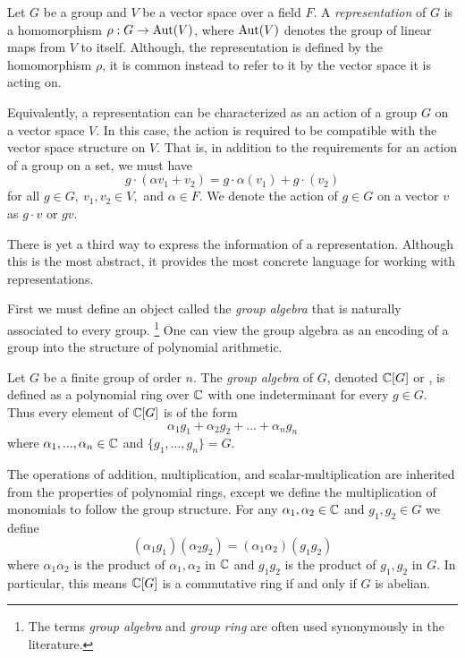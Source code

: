 \begin{definition}
    Let $G$ be a group and $V$ be a vector space over a field $F$. A \emph{representation} of $G$ is a homomorphism 
    $\rho : G \rightarrow \operatorname{Aut}(V)$, where $\operatorname{Aut}(V)$ denotes the group of linear maps from $V$ to itself. Although, 
    the representation is defined by the homomorphism $\rho$, it is common instead to refer to it by the vector 
    space it is acting on.
    
    Equivalently, a representation can be characterized as an action of a group $G$ on a vector space $V$. In this 
    case, the action is required to be compatible with the vector space structure on $V$. That is, in addition to 
    the requirements for an action of a group on a set, we must have
\[g \cdot (\alpha v_1 + v_2) = g\cdot \alpha(v_1) + g\cdot(v_2)\]
    for all $g \in G,\ v_1, v_2 \in V,$ and $\alpha \in F$.
    We denote the action of $g \in G$ on a vector $v$ as $g \cdot v$ or $gv$.
\end{definition}


    There is yet a third way to express the information of a representation. Although this is the most abstract, it 
    provides the most concrete language for working with representations.
    
    First we must define an object called the \emph{group algebra} that is naturally associated to every group.
    \footnote{The terms \emph{group algebra} and \emph{group ring} are often used synonymously in the literature.} 
    One can view the group algebra as an encoding of a group into the structure of polynomial arithmetic.


\begin{definition}
    Let $G$ be a finite group of order $n$. The \emph{group algebra} of $G$, denoted $\mathbb{C}[G]$ or \CG, is defined as 
    a polynomial ring over $\mathbb{C}$ with one indeterminant for every $g \in G$. Thus every element of $\mathbb{C}[G]$ is of the 
    form
    \[
        \alpha_1 g_1 + \alpha_2 g_2 + ... + \alpha_n g_n
    \]
    where $\alpha_1, ..., \alpha_n \in \mathbb{C}$ and $\{g_1, ..., g_n\} = G$.
    
    The operations of addition, multiplication, and scalar-multiplication are inherited from the properties of 
    polynomial rings, except we define the multiplication of monomials to follow the group structure.
    For any $\alpha_1, \alpha_2 \in \mathbb{C}$ and $g_1, g_2 \in G$ we define
    \[
        (\alpha_1g_1)(\alpha_2g_2) = (\alpha_1\alpha_2)(g_1g_2)
    \]
    where $\alpha_1\alpha_2$ is the product of $\alpha_1, \alpha_2$ in $\mathbb{C}$ and $g_1 g_2$ is the product of $g_1, 
    g_2$ in $G$. In particular, this means $\mathbb{C}[G]$ is a commutative ring if and only if $G$ is abelian.
\end{definition}


